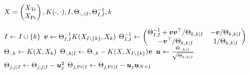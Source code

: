 \begin{algorithmic}[1]
  \REQUIRE \(
    X = \begin{pmatrix} X_{\text{Tr}} \\ X_{\text{Pr}} \end{pmatrix},
    K(\cdot, \cdot), I, \Theta_{:, : \mid I}, \Theta_{I, I}^{-1}, k
  \)

  \STATE \( I \gets I \cup \{ k \} \)
  \STATE \( \bm{v} \gets \Theta_{I, I}^{-1}
    K(X_{I \setminus \{ k \}}, X_k) \)
  \STATE \(
    \Theta_{I, I}^{-1} \gets
    \begin{pmatrix}
      \Theta_{I, I}^{-1} + \bm{v} \bm{v}^{\top}/\Theta_{k, k \mid I} &
      -\bm{v}/\Theta_{k, k \mid I} \\
      -\bm{v}^{\top}/\Theta_{k, k \mid I} &
      1/\Theta_{k, k \mid I}
    \end{pmatrix}
  \)
  \STATE \( \Theta_{:, k} \gets K(X, X_k) \)
  \STATE \(
    \Theta_{:, k \mid I} \gets \Theta_{:, k} -
    K(X, X_{I \setminus \{ k \}}) \bm{v}
  \)
  \STATE \(
    \bm{u} \gets \frac{\Theta_{:, k \mid I}}{\sqrt{\Theta_{k, k \mid I}}}
  \)
    \STATE \(
      \Theta_{j, j \mid I} \gets
      \Theta_{j, j \mid I} -
      \bm{u}_j^2
    \)
    \STATE \(
      \Theta_{j, \text{Pr} \mid I} \gets
      \Theta_{j, \text{Pr} \mid I} -
      \bm{u}_j \bm{u}_{N + 1}
    \)
  \ENDFOR
\end{algorithmic}
